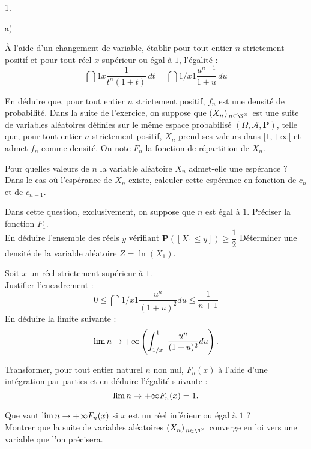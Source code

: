 \documentclass[11pt]{article}%
\begin{document}
\begin{noliste}{1.}
\begin{noliste}{a)}
 \setlength{\itemsep}{2mm}
\item À l'aide d'un changement de variable, établir pour tout entier
$n$
strictement positif et pour tout réel $x$ supérieur ou égal à $1$,
l'égalité :
\[
\dint{1}{x}\dfrac{1}{t^{n}(1 + t)}\,dt = \dint{1/x}{1}\dfrac{u^{n-1}}{1
+ u}\,du
\]

\item En déduire que, pour tout entier $n$ strictement positif, $f_{n}$
est
une densité de probabilité. Dans la suite de l'exercice, on suppose que
$(X_{n})_{\,n\in \N^{\times }}$ est une suite de variables aléatoires
définies sur le même espace probabilisé $\left(
\Omega,\mathcal{A},\mathbf{P}\right) $, telle que, pour tout entier $n$
strictement positif, $X_{n}$
prend ses valeurs dans $[1, + \infty \lbrack $ et admet $f_{n}$ comme
densité.
On note $F_{n}$ la fonction de répartition de $X_{n}$.

\item Pour quelles valeurs de $n$ la variable aléatoire $X_{n}$
admet-elle
une espérance ? Dans le cas où l'espérance de $X_{n}$ existe, calculer
cette
espérance en fonction de $c_{n}$ et de $c_{n-1}$.

\item Dans cette question, exclusivement, on suppose que $n$ est égal à
$1$.
Préciser la fonction $F_{1}$.\\
En déduire l'ensemble des réels $y$ vérifiant $\mathbf{P}([X_{1}\leq
y])\geq \dfrac{1}{2}$ Déterminer une densité de la variable aléatoire
$Z = \ln (X_{1})$.

\item Soit $x$ un réel strictement supérieur à $1$.\\
Justifier l'encadrement :
\[
0\leq \dint{1/x}{1}\dfrac{u^{n}}{(1 + u)^{2}}du\leq \dfrac{1}{n + 1}
\]
En déduire la limite suivante :
\[
\lim{n\rightarrow + \infty }\left( \displaystyle \int_{1/x}^{1}\ \dfrac{u^{n}}{(1 +
u)^{2}}du\right).
\]

Transformer, pour tout entier naturel $n$ non nul, $F_{n}(x)$ à l'aide
d'une
intégration par parties et en déduire l'égalité suivante :
\[
\lim{n\rightarrow + \infty }F_{n}(x) = 1.
\]

\item Que vaut $\lim{n\rightarrow + \infty }F_{n}(x)$ si $x$ est un
réel inférieur ou égal à $1$ ? \\
Montrer que la suite de variables aléatoires $(X_{n})_{\,n\in
\N^{\times }}$ converge en loi vers une variable que l'on précisera.
\end{noliste}
\end{noliste}
\end{document}
